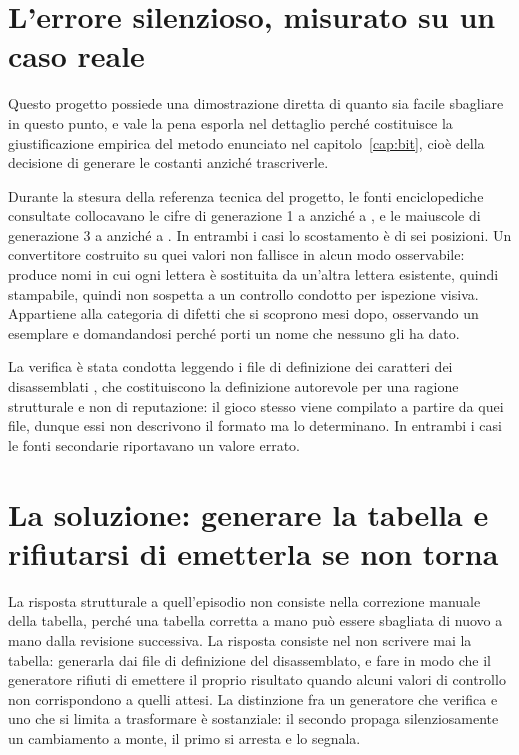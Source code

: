 \section{L'errore silenzioso, misurato su un caso reale}

Questo progetto possiede una dimostrazione diretta di quanto sia facile sbagliare in questo punto, e vale la pena esporla nel dettaglio perché costituisce la giustificazione empirica del metodo enunciato nel capitolo~\ref{cap:bit}, cioè della decisione di generare le costanti anziché trascriverle.

Durante la stesura della referenza tecnica del progetto, le fonti enciclopediche consultate collocavano le cifre di generazione 1 a  anziché a , e le maiuscole di generazione 3 a  anziché a . In entrambi i casi lo scostamento è di sei posizioni. Un convertitore costruito su quei valori non fallisce in alcun modo osservabile: produce nomi in cui ogni lettera è sostituita da un'altra lettera esistente, quindi stampabile, quindi non sospetta a un controllo condotto per ispezione visiva. Appartiene alla categoria di difetti che si scoprono mesi dopo, osservando un esemplare e domandandosi perché porti un nome che nessuno gli ha dato.

La verifica è stata condotta leggendo i file di definizione dei caratteri dei disassemblati \cite{pokered,pokeemerald}, che costituiscono la definizione autorevole per una ragione strutturale e non di reputazione: il gioco stesso viene compilato a partire da quei file, dunque essi non descrivono il formato ma lo determinano. In entrambi i casi le fonti secondarie riportavano un valore errato.

\section{La soluzione: generare la tabella e rifiutarsi di emetterla se non torna}

La risposta strutturale a quell'episodio non consiste nella correzione manuale della tabella, perché una tabella corretta a mano può essere sbagliata di nuovo a mano dalla revisione successiva. La risposta consiste nel non scrivere mai la tabella: generarla dai file di definizione del disassemblato, e fare in modo che il generatore rifiuti di emettere il proprio risultato quando alcuni valori di controllo non corrispondono a quelli attesi. La distinzione fra un generatore che verifica e uno che si limita a trasformare è sostanziale: il secondo propaga silenziosamente un cambiamento a monte, il primo si arresta e lo segnala.

